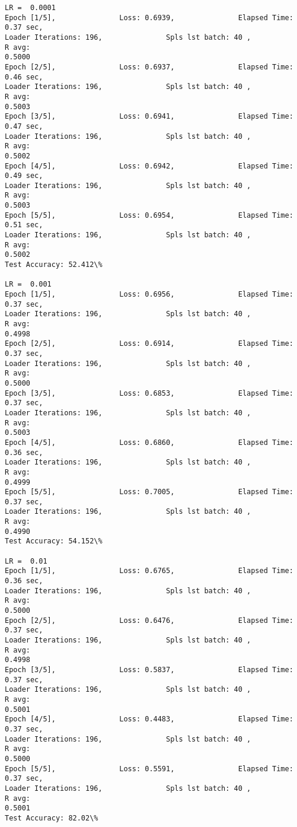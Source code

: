 \documentclass[11pt]{article}
\begin{document}
    \begin{Verbatim}[commandchars=\\\{\}]
LR =  0.0001
Epoch [1/5],               Loss: 0.6939,               Elapsed Time: 0.37 sec,
Loader Iterations: 196,               Spls lst batch: 40 ,               R avg:
0.5000
Epoch [2/5],               Loss: 0.6937,               Elapsed Time: 0.46 sec,
Loader Iterations: 196,               Spls lst batch: 40 ,               R avg:
0.5003
Epoch [3/5],               Loss: 0.6941,               Elapsed Time: 0.47 sec,
Loader Iterations: 196,               Spls lst batch: 40 ,               R avg:
0.5002
Epoch [4/5],               Loss: 0.6942,               Elapsed Time: 0.49 sec,
Loader Iterations: 196,               Spls lst batch: 40 ,               R avg:
0.5003
Epoch [5/5],               Loss: 0.6954,               Elapsed Time: 0.51 sec,
Loader Iterations: 196,               Spls lst batch: 40 ,               R avg:
0.5002
Test Accuracy: 52.412\%

LR =  0.001
Epoch [1/5],               Loss: 0.6956,               Elapsed Time: 0.37 sec,
Loader Iterations: 196,               Spls lst batch: 40 ,               R avg:
0.4998
Epoch [2/5],               Loss: 0.6914,               Elapsed Time: 0.37 sec,
Loader Iterations: 196,               Spls lst batch: 40 ,               R avg:
0.5000
Epoch [3/5],               Loss: 0.6853,               Elapsed Time: 0.37 sec,
Loader Iterations: 196,               Spls lst batch: 40 ,               R avg:
0.5003
Epoch [4/5],               Loss: 0.6860,               Elapsed Time: 0.36 sec,
Loader Iterations: 196,               Spls lst batch: 40 ,               R avg:
0.4999
Epoch [5/5],               Loss: 0.7005,               Elapsed Time: 0.37 sec,
Loader Iterations: 196,               Spls lst batch: 40 ,               R avg:
0.4990
Test Accuracy: 54.152\%

LR =  0.01
Epoch [1/5],               Loss: 0.6765,               Elapsed Time: 0.36 sec,
Loader Iterations: 196,               Spls lst batch: 40 ,               R avg:
0.5000
Epoch [2/5],               Loss: 0.6476,               Elapsed Time: 0.37 sec,
Loader Iterations: 196,               Spls lst batch: 40 ,               R avg:
0.4998
Epoch [3/5],               Loss: 0.5837,               Elapsed Time: 0.37 sec,
Loader Iterations: 196,               Spls lst batch: 40 ,               R avg:
0.5001
Epoch [4/5],               Loss: 0.4483,               Elapsed Time: 0.37 sec,
Loader Iterations: 196,               Spls lst batch: 40 ,               R avg:
0.5000
Epoch [5/5],               Loss: 0.5591,               Elapsed Time: 0.37 sec,
Loader Iterations: 196,               Spls lst batch: 40 ,               R avg:
0.5001
Test Accuracy: 82.02\%


\end{Verbatim}
\end{document}

